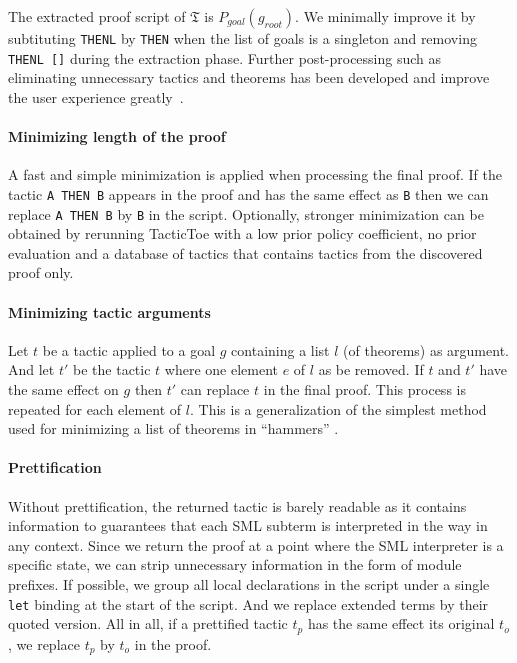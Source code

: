 \documentclass[runningheads,a4paper,draft]{svjour3}
\def\sml{\textsf{SML}\xspace}
\def\tactictoe{\textsf{TacticToe}\xspace}
\begin{document}
The extracted proof script of $\mathfrak{T}$ is $P_{goal}(g_{root})$.
We minimally improve it by subtituting \texttt{THENL} by \texttt{THEN} when the
list of goals is a singleton and removing \texttt{THENL []} during the
extraction phase.
Further post-processing such as
eliminating unnecessary tactics and theorems has been developed and
improve the user experience greatly~\cite{DBLP:conf/sefm/Adams15}.

\paragraph{Minimizing length of the proof}
A fast and simple minimization is applied when processing the final proof. If
the tactic \texttt{A THEN B} appears in the proof and has the same effect as
\texttt{B} then we can replace \texttt{A THEN B} by \texttt{B} in the script.
Optionally, stronger minimization can be obtained
by rerunning \tactictoe with a low prior
policy coefficient, no prior evaluation and a database of tactics that contains
tactics from the discovered proof only.

\paragraph{Minimizing tactic arguments}
Let $t$ be a tactic applied to a goal $g$ containing a list $l$ (of theorems)
as argument. And let $t'$ be the tactic $t$ where one element $e$ of $l$ as be
removed. If $t$ and $t'$ have the same effect on $g$ then $t'$ can replace $t$
in the final proof. This process is repeated for each element of $l$.
This is a generalization of the simplest method used for minimizing a list of
theorems in ``hammers'' \cite{hammers4qed}.

\paragraph{Prettification}
Without prettification, the returned tactic is barely readable as it contains
information to guarantees that each \sml subterm is interpreted in the way in
any context. Since we return the proof at a point where the \sml interpreter is
a specific state, we can strip unnecessary information in the form of
module prefixes. If possible, we group all local declarations in the
script under a single \texttt{let} binding at the start of the script. And we
replace extended terms by their quoted version.
All in all, if a prettified tactic $t_p$ has the same effect its original
$t_o$, we replace $t_p$ by $t_o$ in the proof.\\
\end{document}
